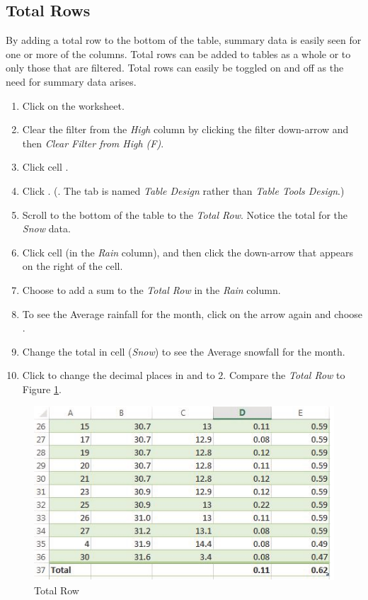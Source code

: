 \subsection{Total Rows}

By adding a total row to the bottom of the table, summary data is easily seen for one or more of the columns. Total rows can be added to tables as a whole or to only those that are filtered. Total rows can easily be toggled on and off as the need for summary data arises.

\begin{enumerate}
	\item Click on the  worksheet.
	\item Clear the filter from the \textit{High} column by clicking the filter down-arrow and then \textit{Clear Filter from High (\textdegree F)}.
	\item Click cell .
	\item Click . (. The tab is named \textit{Table Design} rather than \textit{Table Tools Design}.)
	\item Scroll to the bottom of the table to the \textit{Total Row}. Notice the total for the \textit{Snow} data.
	\item Click cell  (in the \textit{Rain} column), and then click the down-arrow that appears on the right of the cell.
	\item Choose  to add a sum to the \textit{Total Row} in the \textit{Rain} column.
	\item To see the Average rainfall for the month, click on the arrow again and choose .
	\item Change the total in cell  (\textit{Snow}) to see the Average snowfall for the month.
	\item Click  to change the decimal places in  and  to $ 2 $. Compare the \textit{Total Row} to Figure \ref{05:fig22}.
\end{enumerate}

\begin{figure}[H]
	\centering
	\includegraphics[width=\maxwidth{.95\linewidth}]{gfx/ch05_fig22}
	\caption{Total Row}
	\label{05:fig22}
\end{figure}

